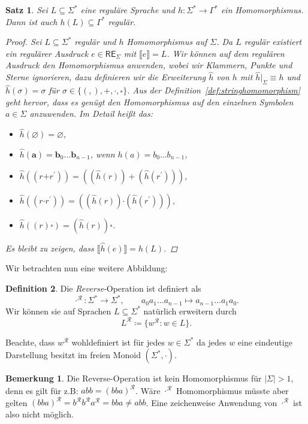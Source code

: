 \documentclass[11pt, a4paper]{article}
\theoremstyle{definition}
\newtheorem{definition}{Definition}[section]
\newtheorem*{remark*}{Bemerkung}
\theoremstyle{plain}
\newtheorem{theorem}[definition]{Satz}
\numberwithin{equation}{section}
\let\emptyset\varnothing
\begin{document}
\begin{theorem}
	Sei \( L \subseteq \Sigma^\ast \) eine reguläre Sprache und \( h\colon \Sigma^\ast \to \Gamma^\ast \) ein Homomorphismus. Dann ist auch \( h(L) \subseteq \Gamma^\ast \) regulär.
	\begin{proof}
		Sei \( L \subseteq \Sigma^\ast \) regulär und \( h \) Homomorphismus auf \( \Sigma \). Da \( L \) regulär existiert ein regulärer Ausdruck \( e \in \mathsf{RE}_\Sigma \) mit \( \llbracket e \rrbracket = L \). Wir können auf dem regulären Ausdruck den Homomorphismus anwenden, wobei wir Klammern, Punkte und Sterne ignorieren, dazu definieren wir die Erweiterung \( \hat{h} \) von \( h \) mit \( \hat{h} \vert_\Sigma \equiv h \) und \( \hat{h}(\sigma) = \sigma \) für \( \sigma \in \{(,),\bm{+}, \bm{\cdot}, \overset{\bm{\ast}}{}\} \). Aus der Definition~\ref{def:stringhomomorphism} geht hervor, dass es genügt den Homomorphismus auf den einzelnen Symbolen \( a \in \Sigma \) anzuwenden. Im Detail heißt das: 
		\begin{itemize}
			\item \( \hat{h}(\bm{\emptyset}) = \bm{\emptyset} \),
			\item \( \hat{h}(\bm{a}) = \bm{b}_0 \ldots \bm{b}_{n-1} \), wenn \( h(a) = b_0 \ldots b_{n-1} \),
			\item \( \hat{h}((r \bm{+} r^\prime)) = ((\hat{h}(r)) + (\hat{h}(r^\prime))) \),
			\item \( \hat{h}((r \bm{\cdot} r^\prime)) = ((\hat{h}(r)) \bm{\cdot} (\hat{h}(r^\prime))) \),
			\item \( \hat{h}((r)\overset{\bm{\ast}}{}) = (\hat{h}(r))\overset{\bm{\ast}}{} \).
		\end{itemize} 
		Es bleibt zu zeigen, dass \( \llbracket \hat{h}(e) \rrbracket = h(L) \).
	\end{proof}
\end{theorem}
Wir betrachten nun eine weitere Abbildung:
\begin{definition}
	Die \textit{Reverse}-Operation ist definiert als
	\[
		\cdot^\mathcal{R} \colon \Sigma^\ast \to \Sigma^\ast, \quad\quad a_0 a_1 \ldots a_{n-1} \mapsto a_{n-1} \ldots a_1 a_0.
	\]
	Wir können sie auf Sprachen \( L \subseteq \Sigma^\ast \) natürlich erweitern durch
	\[
		L^\mathcal{R} \coloneqq \{ w^\mathcal{R} : w \in L \}.
	\]
\end{definition}
Beachte, dass \( w^\mathcal{R} \) wohldefiniert ist für jedes \( w \in \Sigma
^\ast \) da jedes \( w \) eine eindeutige Darstellung besitzt im freien Monoid \( (\Sigma^\ast, \cdot) \).
\begin{remark*}
	Die Reverse-Operation ist kein Homomorphismus für \( \left| \Sigma \right| > 1 \), denn es gilt für z.B: \( abb = (bba)^\mathcal{R} \). Wäre \( \cdot^\mathcal{R} \) Homomorphismus müsste aber gelten \( (bba)^\mathcal{R} = b^\mathcal{R} b^\mathcal{R} a^\mathcal{R} = bba \neq abb \). Eine zeichenweise Anwendung von \( \cdot^\mathcal{R} \) ist also nicht möglich.
\end{remark*}
\end{document}
